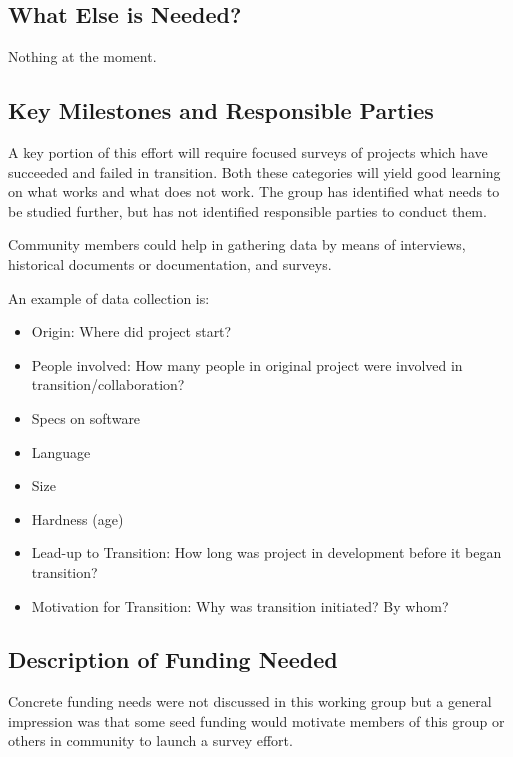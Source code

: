 \subsection{What Else is Needed?}
Nothing at the moment. 

\subsection{Key Milestones and Responsible Parties}

A key portion of this effort will require focused surveys of projects which have
succeeded and failed in transition. Both these categories will yield good
learning on what works and what does not work. The group has identified what
needs to be studied further, but has not identified responsible parties to
conduct them.

Community members could help in gathering data by means of interviews, historical
documents or documentation, and surveys.

An example of data collection is: 
\begin{itemize}
\item Origin: Where did project start? 
\item People involved: How many people in original project were involved in
transition/collaboration?
\item Specs on software
\item Language
\item Size
\item Hardness (age)
\item Lead-up to Transition: How long was project in development before it began transition?
\item Motivation for Transition: Why was transition initiated? By whom? 
\end{itemize}

\subsection{Description of Funding Needed}

Concrete funding needs were not discussed in this working group but a general
impression was that some seed funding would motivate members of this group or
others in community to launch a survey effort.
